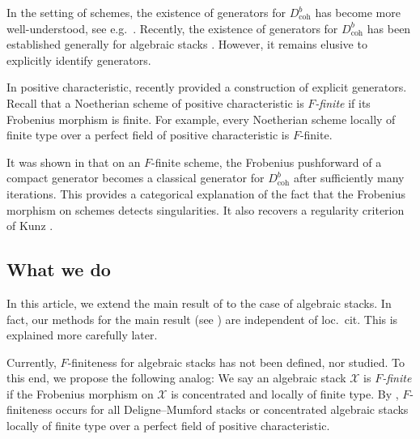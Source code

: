 \documentclass[11pt]{amsart}
\theoremstyle{plain}
\theoremstyle{definition}
\numberwithin{equation}{section}
\numberwithin{theorem}{section}
\begin{document}
In the setting of schemes, the existence of generators for $D^b_{\operatorname{coh}}$ has become more well-understood, see e.g.\ \cite{Bondal/VandenBergh:2003,Rouquier:2008,Keller/Murfet/VanDenBergh:2009,Lunts:2010,Elagin/Lunts/Schnurer:2020,Iyengar/Takahashi:2016,Aoki:2021}. 
Recently, the existence of generators for $D^b_{\operatorname{coh}}$ has been established generally for algebraic stacks \cite{Hall/Priver:2024,DeDeyn/Lank/ManaliRahul:2025,DeDeyn/Lank/ManaliRahul/Peng:2025}. 
However, it remains elusive to explicitly identify generators. 

In positive characteristic, \cite{Ballard/Iyengar/Lank/Mukhopadhyay/Pollitz:2023} recently provided a construction of explicit generators. Recall that a Noetherian scheme of positive characteristic is \textit{$F$-finite} if its Frobenius morphism is finite. For example, every Noetherian scheme locally of finite type over a perfect field of positive characteristic is $F$-finite. 

It was shown in \cite{Ballard/Iyengar/Lank/Mukhopadhyay/Pollitz:2023} that on an $F$-finite scheme, the Frobenius pushforward of a compact generator becomes a classical generator for $D^b_{\operatorname{coh}}$ after sufficiently many iterations. 
This provides a categorical explanation of the fact that the Frobenius morphism on schemes detects singularities. 
It also recovers a regularity criterion of Kunz \cite{Kunz:1969}.

\subsection{What we do}
\label{sec:intro_what_we_do}

In this article, we extend the main result of \cite{Ballard/Iyengar/Lank/Mukhopadhyay/Pollitz:2023} to the case of algebraic stacks. 
In fact, our methods for the main result (see ) are independent of loc.\ cit.
This is explained more carefully later.

Currently, $F$-finiteness for algebraic stacks has not been defined, nor studied. 
To this end, we propose the following analog: We say an algebraic stack $\mathcal{X}$ is \textit{$F$-finite} if the Frobenius morphism on $\mathcal{X}$ is concentrated and locally of finite type.
By , $F$-finiteness occurs for all Deligne--Mumford stacks or concentrated algebraic stacks locally of finite type over a perfect field of positive characteristic.
\end{document}
